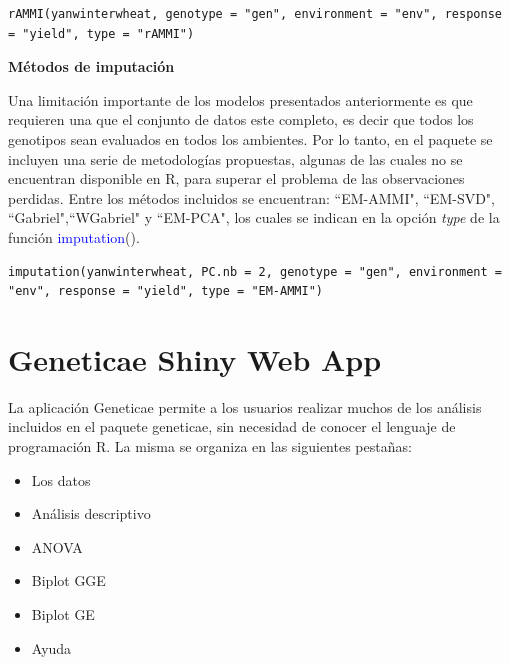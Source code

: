 \begin{tcolorbox}[skin=bicolor,
    colframe=aurometalsaurus,colback=backcolour,colbacklower=white,
    width=1\linewidth,
    height=0.1\linewidth,
    boxsep=-3mm]
\begin{lstlisting}
rAMMI(yanwinterwheat, genotype = "gen", environment = "env", response = "yield", type = "rAMMI")
\end{lstlisting}
\end{tcolorbox}



\textbf{Métodos de imputación}

Una limitación importante de los modelos presentados anteriormente es que requieren una que el conjunto de datos este completo, es decir que todos los genotipos sean evaluados en todos los ambientes. Por lo tanto, en el paquete se incluyen una serie de metodologías propuestas, algunas de las cuales no se encuentran disponible en R, para superar el problema de las observaciones perdidas. Entre los métodos incluidos se encuentran: ``EM-AMMI", ``EM-SVD", ``Gabriel",``WGabriel" y ``EM-PCA", los cuales se indican en la opción \emph{type} de la función \textcolor{blue}{imputation}().

\begin{tcolorbox}[skin=bicolor,
    colframe=aurometalsaurus,colback=backcolour,colbacklower=white,
    width=1\linewidth,
    height=0.1\linewidth,
    boxsep=-3mm]
\begin{lstlisting}
imputation(yanwinterwheat, PC.nb = 2, genotype = "gen", environment = "env", response = "yield", type = "EM-AMMI")
\end{lstlisting}
\end{tcolorbox}


\section{Geneticae Shiny Web App}

La aplicación Geneticae permite a los usuarios realizar muchos de los análisis incluidos en el paquete geneticae, sin necesidad de conocer el lenguaje de programación R. La misma se organiza en las siguientes pestañas:
\begin{itemize}
\item Los datos
\item Análisis descriptivo
\item ANOVA
\item Biplot GGE
\item Biplot GE
\item Ayuda
\end{itemize}



